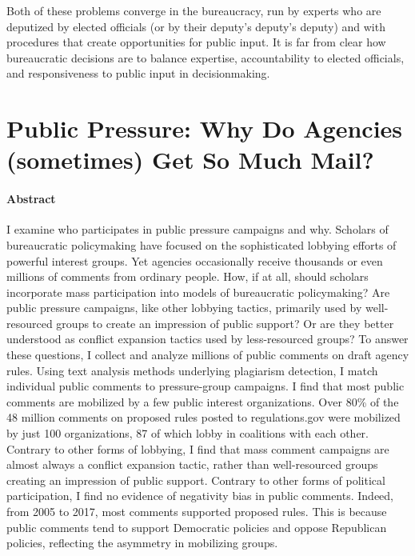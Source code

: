 \documentclass[
]{book}
\begin{document}
Both of these problems converge in the bureaucracy, run by experts who are deputized by elected officials (or by their deputy's deputy's deputy) and with procedures that create opportunities for public input. It is far from clear how bureaucratic decisions are to balance expertise, accountability to elected officials, and responsiveness to public input in decisionmaking.

\hypertarget{public-pressure-why-do-agencies-sometimes-get-so-much-mail}{%
\chapter{Public Pressure: Why Do Agencies (sometimes) Get So Much Mail?}\label{public-pressure-why-do-agencies-sometimes-get-so-much-mail}}

\hypertarget{abstract-1}{%
\subsubsection*{Abstract}\label{abstract-1}}

I examine who participates in public pressure campaigns and why. Scholars of bureaucratic policymaking have focused on the sophisticated lobbying efforts of powerful interest groups. Yet agencies occasionally receive thousands or even millions of comments from ordinary people. How, if at all, should scholars incorporate mass participation into models of bureaucratic policymaking? Are public pressure campaigns, like other lobbying tactics, primarily used by well-resourced groups to create an impression of public support? Or are they better understood as conflict expansion tactics used by less-resourced groups? To answer these questions, I collect and analyze millions of public comments on draft agency rules. Using text analysis methods underlying plagiarism detection, I match individual public comments to pressure-group campaigns. I find that most public comments are mobilized by a few public interest organizations. Over 80\% of the 48 million comments on proposed rules posted to regulations.gov were mobilized by just 100 organizations, 87 of which lobby in coalitions with each other. Contrary to other forms of lobbying, I find that mass comment campaigns are almost always a conflict expansion tactic, rather than well-resourced groups creating an impression of public support. Contrary to other forms of political participation, I find no evidence of negativity bias in public comments. Indeed, from 2005 to 2017, most comments supported proposed rules. This is because public comments tend to support Democratic policies and oppose Republican policies, reflecting the asymmetry in mobilizing groups.
\end{document}
